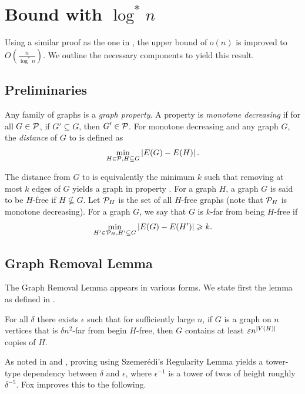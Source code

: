 \section{Bound with $\log^* n$}

Using a similar proof as the one in , the upper bound of $o(n)$ is improved to $O\left(\frac{n}{\log^* n}\right)$. We outline the necessary components to yield this result.

\subsection{Preliminaries~\cite{Lee15}}

\begin{definition}
	Any family of graphs \cP is a {\em graph property}.
	A property \cP is {\em monotone decreasing} if for all $G \in {\mathcal P}$, if $G' \subseteq G$, then $G' \in {\mathcal P}$. For monotone decreasing \cP and any graph $G$, the {\em distance} of $G$ to \cP is defined as
	\begin{align*}
		\underset{H\in {\mathcal P}, H\subseteq G}{\min}\left\vert{E(G)-E(H)}\right\vert.
	\end{align*}
\end{definition}
The distance from $G$ to \cP is equivalently the minimum $k$ such that removing at most $k$ edges of $G$ yields a graph in property \cP. For a graph $H$, a graph $G$ is said to be $H$-free if $H \not\subseteq G$. Let ${\mathcal P}_H$ is the set of all $H$-free graphs (note that ${\mathcal P}_H$ is monotone decreasing). For a graph $G$, we say that $G$ is $k$-far from being $H$-free if
\begin{align*}
	\underset{H'\in {\mathcal P}_H, H'\subseteq G}{\min}\left\vert{E(G)-E(H')}\right\vert \geqslant k.
\end{align*}

\subsection{Graph Removal Lemma}
The Graph Removal Lemma appears in various forms. We state first the lemma as defined in \cite{Lee15}.

\begin{lemma}\label{lem:graph-removal-1}
	For all $\delta$ there exists $\epsilon$ such that for sufficiently large $n$, if $G$ is a graph on $n$ vertices that is $\delta n^2$-far from begin $H$-free, then $G$ contains at least $\varepsilon n^{\left\vert{V(H)}\right\vert}$ copies of $H$.
\end{lemma}
As noted in \cite{Lee15} and \cite{Fox11}, proving  using Szemer\'edi's Regularity Lemma yields a tower-type dependency between $\delta$ and $\epsilon$, where $\epsilon^{-1}$ is a tower of twos of height roughly $\delta^{-5}$. Fox improves this to the following.


